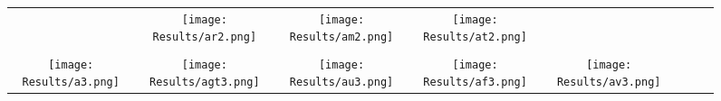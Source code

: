 \documentclass[journal]{IEEEtran}
\begin{document}
\begin{figure*}[!t]
\begin{tabular}{cccccccc}
		&
		\hspace{0.4cm}
		\begin{minipage}{30pt}
			\texttt{[image: Results/ar2.png]}
\end{minipage}
		&
		\hspace{0.4cm}
		\begin{minipage}{30pt}
			\texttt{[image: Results/am2.png]}
\end{minipage}
		&
		\hspace{0.4cm}
		\begin{minipage}{30pt}
			\texttt{[image: Results/at2.png]}
\end{minipage}
		\\
		\\
		\begin{minipage}{30pt}
			\texttt{[image: Results/a3.png]}
\end{minipage}
		&
		\hspace{0.4cm}
		\begin{minipage}{30pt}
			\texttt{[image: Results/agt3.png]}
\end{minipage}
		&
		\hspace{0.4cm}
		\begin{minipage}{30pt}
			\texttt{[image: Results/au3.png]}
\end{minipage}
		&
		\hspace{0.4cm}
		\begin{minipage}{30pt}
			\texttt{[image: Results/af3.png]}
\end{minipage}
		&
		\hspace{0.4cm}
		\begin{minipage}{30pt}
			\texttt{[image: Results/av3.png]}
\end{minipage}
		&
		

\end{tabular}
\end{figure*}
\end{document}
